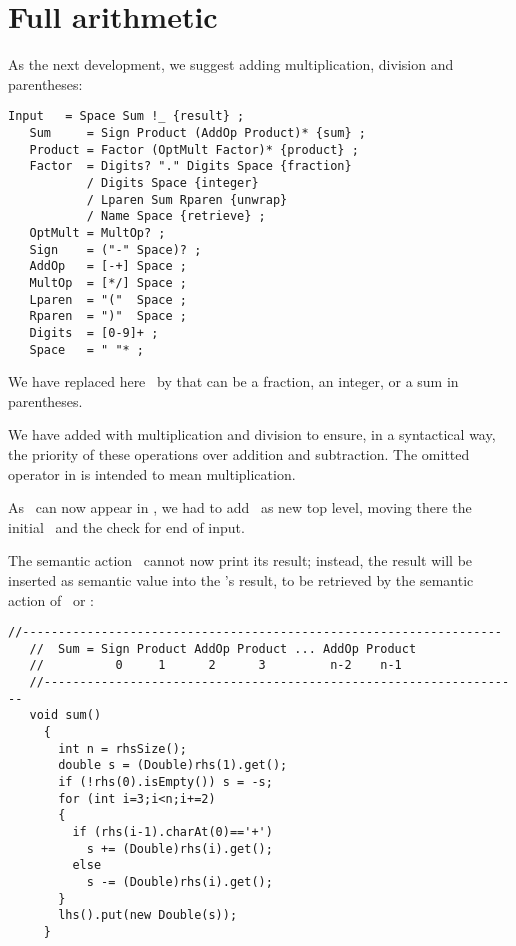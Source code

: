 
\section{Full arithmetic\label{arith}}


As the next development, we suggest adding multiplication, division
and parentheses:

\small
\begin{Verbatim}[frame=single,framesep=2mm,samepage=true,xleftmargin=15mm,xrightmargin=15mm,baselinestretch=0.8]
   Input   = Space Sum !_ {result} ;
   Sum     = Sign Product (AddOp Product)* {sum} ;
   Product = Factor (OptMult Factor)* {product} ;
   Factor  = Digits? "." Digits Space {fraction}
           / Digits Space {integer}
           / Lparen Sum Rparen {unwrap} 
           / Name Space {retrieve} ; 
   OptMult = MultOp? ;
   Sign    = ("-" Space)? ;
   AddOp   = [-+] Space ;
   MultOp  = [*/] Space ;
   Lparen  = "("  Space ;
   Rparen  = ")"  Space ;
   Digits  = [0-9]+ ;
   Space   = " "* ;
\end{Verbatim}
\normalsize

We have replaced here \Number\ by  that can be 
a fraction, an integer, or a sum in parentheses.

We have added  with multiplication and division
to ensure, in a syntactical way, the priority of these operations
over addition and subtraction.
The omitted operator in  is intended to mean multiplication.

As \Sum\ can now appear in ,
we had to add \Input\ as new top level, 
moving there the initial \Space\ and the check for end of input.

The semantic action \Suma\ cannot now print its result;
instead, the result will be inserted as semantic value 
into the \Sum's result,
to be retrieved by the semantic action of \Input\ or \Factor:

\small
\begin{Verbatim}[frame=single,framesep=2mm,samepage=true,xleftmargin=15mm,xrightmargin=15mm,baselinestretch=0.8]
   //-------------------------------------------------------------------
   //  Sum = Sign Product AddOp Product ... AddOp Product
   //          0     1      2      3         n-2    n-1
   //-------------------------------------------------------------------
   void sum()
     {
       int n = rhsSize();
       double s = (Double)rhs(1).get();
       if (!rhs(0).isEmpty()) s = -s;
       for (int i=3;i<n;i+=2)
       {
         if (rhs(i-1).charAt(0)=='+')
           s += (Double)rhs(i).get();
         else
           s -= (Double)rhs(i).get();
       }
       lhs().put(new Double(s));
     }
\end{Verbatim}
\normalsize

